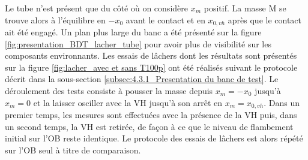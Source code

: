 Le tube n'est présent que du côté où on considère $x_m$ positif. La masse M se trouve alors à l'équilibre en $-x_{0}$ avant le contact et en $x_{0,vh}$ après que le contact ait été engagé. Un plan plus large du banc a été présenté sur la figure \ref{fig:presentation_BDT_lacher_tube} pour avoir plus de visibilité sur les composants environnants. Les essais de lâchers dont les résultats sont présentés sur la figure \ref{fig:lacher_avec et sans T100p} ont été réalisés suivant le protocole décrit dans la sous-section \ref{subsec:4.3.1_Presentation du banc de test}. Le déroulement des tests consiste à pousser la masse depuis $x_m=-x_0$ jusqu'à $x_m=0$ et la laisser osciller avec la VH jusqu'à son arrêt en $x_m=x_{0,vh}$. Dans un premier temps, les mesures sont effectuées avec la présence de la VH puis, dans un second temps, la VH est retirée, de façon à ce que le niveau de flambement initial sur l'OB reste identique. Le protocole des essais de lâchers est alors répété sur l'OB seul à titre de comparaison.

